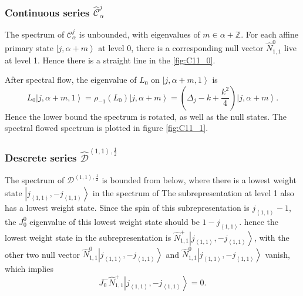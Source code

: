\documentclass[10pt,a4paper]{article}
\numberwithin{equation}{section}
\newcommand{\ket}[1]{\left| #1 \right\rangle}
\newcommand{\vev}[1]{\left\langle #1 \right\rangle}
\begin{document}
\subsubsection*{Continuous series \texorpdfstring{$\widehat{\mathcal{C}}^{j}_{\alpha}$}{Lg}}
The spectrum of $\mathcal{C}^{j}_{\alpha}$ is unbounded, with eigenvalues of $m\in \alpha + \mathbb{Z}$. For each affine primary state 
$\ket{j,\alpha+m}$ at level 0, there is a corresponding null vector $\hat{N}^{0}_{1,1}$ live at level 1. 
Hence there is a straight line in the \ref{fig:C11_0}. 

After spectral flow, the eigenvalue of $L_{0}$ on $\ket{j,\alpha+m,1}$ is 
\begin{equation}
    L_{0} \ket{j,\alpha + m, 1} = \rho_{-1} \left(L_{0} \right) \ket{j,\alpha + m} = \left(\Delta_{j} - k + \frac{k^{2}}{4} \right) \ket{j,\alpha+m}.
\end{equation}
Hence the lower bound the spectrum is rotated, as well as the null states. The spectral flowed spectrum is plotted in 
figure \ref{fig:C11_1}.

\subsubsection*{Descrete series \texorpdfstring{$\widehat{\mathcal{D}}^{\vev{1,1},\frac{1}{2}}$}{D11}}
The spectrum of $\mathcal{D}^{\vev{1,1},\frac{1}{2}}$ is bounded from below, where there is a lowest weight state $\ket{j_{\vev{1,1}},-j_{\vev{1,1}}}$ in the spectrum of 
The subrepresentation at level 1 also has a lowest weight state. Since the spin of this subrepresentation is $j_{\vev{1,1}}-1$, the $J^{0}_{0}$ 
eigenvalue of this lowest weight state should be $1-j_{\vev{1,1}}$. hence the lowest weight state in the subrepresentation is 
$\hat{N}^{+}_{1,1} \ket{j_{\vev{1,1}},-j_{\vev{1,1}}}$, with the other two null vector $\hat{N}^{0}_{1,1} \ket{j_{\vev{1,1}},-j_{\vev{1,1}}}$ and 
$\hat{N}^{0}_{1,1} \ket{j_{\vev{1,1}},-j_{\vev{1,1}}}$ vanish, which implies 
\begin{equation}
    J^{-}_{0} \hat{N}^{+}_{1,1} \ket{j_{\vev{1,1}},-j_{\vev{1,1}}} = 0.
\end{equation}
\end{document}
